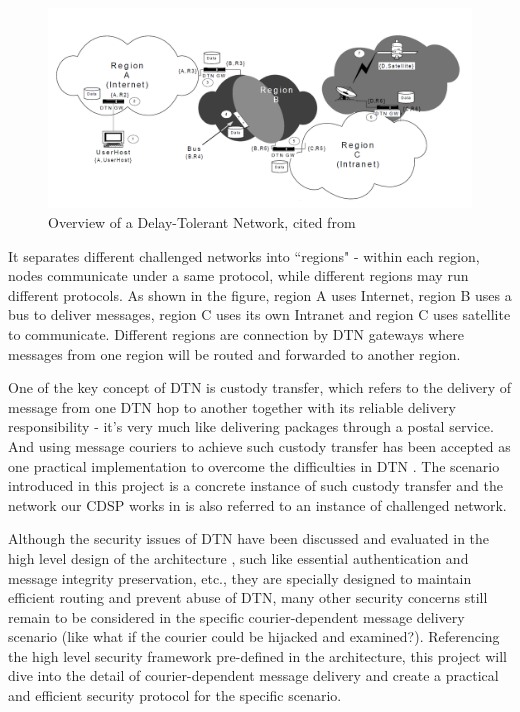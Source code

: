\begin{figure}[h!]
\centering
\includegraphics[width=\textwidth,natwidth=1420,natheight=672]{figures/dtn.png}
\caption{Overview of a Delay-Tolerant Network, cited from \cite{Fall}}
\label{fig:dtn}
\end{figure}

It separates different challenged networks into ``regions" - within each region, nodes communicate under a same protocol, while different regions may run different protocols. As shown in the figure, region A uses Internet, region B uses a bus to deliver messages, region C uses its own Intranet and region C uses satellite to communicate. Different regions are connection by DTN gateways where messages from one region will be routed and forwarded to another region.

One of the key concept of DTN is custody transfer, which refers to the delivery of message from one DTN hop to another together with its reliable delivery responsibility - it's very much like delivering packages through a postal service. And using message couriers to achieve such custody transfer has been accepted as one practical implementation to overcome the difficulties in DTN \cite{Jain}\cite{Zhao}. The scenario introduced in this project is a concrete instance of such custody transfer and the network our CDSP works in is also referred to an instance of challenged network.

Although the security issues of DTN have been discussed and evaluated in the high level design of the architecture \cite{Cerf}\cite{RFC5050}, such like essential authentication and message integrity preservation, etc., they are specially designed to maintain efficient routing and prevent abuse of DTN, many other security concerns still remain to be considered in the specific courier-dependent message delivery scenario (like what if the courier could be hijacked and examined?). Referencing the high level security framework pre-defined in the architecture, this project will dive into the detail of courier-dependent message delivery and create a practical and efficient security protocol for the specific scenario.

